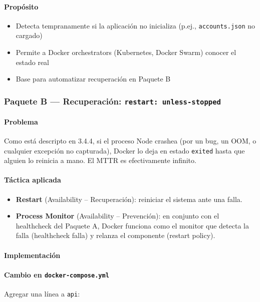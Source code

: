 \paragraph{Propósito}

\begin{itemize}[leftmargin=*]
    \item Detecta tempranamente si la aplicación no inicializa (p.ej., \texttt{accounts.json} no cargado)
    \item Permite a Docker orchestrators (Kubernetes, Docker Swarm) conocer el estado real
    \item Base para automatizar recuperación en Paquete B
\end{itemize}

\subsubsection{Paquete B — Recuperación: \texttt{restart: unless-stopped}}

\paragraph{Problema}

Como está descripto en 3.4.4, si el proceso Node crashea (por un bug, un OOM, o cualquier excepción no capturada), Docker lo deja en estado \texttt{exited} hasta que alguien lo reinicia a mano. El MTTR es efectivamente infinito.

\paragraph{Táctica aplicada}

\begin{itemize}[leftmargin=*]
    \item \textbf{Restart} (Availability -- Recuperación): reiniciar el sistema ante una falla.
    \item \textbf{Process Monitor} (Availability -- Prevención): en conjunto con el healthcheck del Paquete A, Docker funciona como el monitor que detecta la falla (healthcheck falla) y relanza el componente (restart policy).
\end{itemize}

\paragraph{Implementación}

\paragraph{Cambio en \texttt{docker-compose.yml}} Agregar una línea a \texttt{api}:

